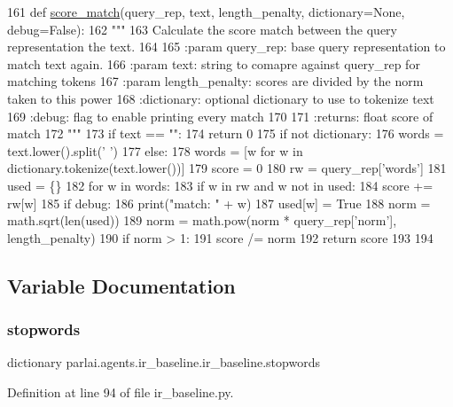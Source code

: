\begin{DoxyCode}
161 \textcolor{keyword}{def }\hyperlink{namespaceparlai_1_1agents_1_1ir__baseline_1_1ir__baseline_a64aaaccb38f5dd5f51c09439456b2f6e}{score\_match}(query\_rep, text, length\_penalty, dictionary=None, debug=False):
162     \textcolor{stringliteral}{"""}
163 \textcolor{stringliteral}{    Calculate the score match between the query representation the text.}
164 \textcolor{stringliteral}{}
165 \textcolor{stringliteral}{    :param query\_rep: base query representation to match text again.}
166 \textcolor{stringliteral}{    :param text: string to comapre against query\_rep for matching tokens}
167 \textcolor{stringliteral}{    :param length\_penalty: scores are divided by the norm taken to this power}
168 \textcolor{stringliteral}{    :dictionary: optional dictionary to use to tokenize text}
169 \textcolor{stringliteral}{    :debug: flag to enable printing every match}
170 \textcolor{stringliteral}{}
171 \textcolor{stringliteral}{    :returns: float score of match}
172 \textcolor{stringliteral}{    """}
173     \textcolor{keywordflow}{if} text == \textcolor{stringliteral}{""}:
174         \textcolor{keywordflow}{return} 0
175     \textcolor{keywordflow}{if} \textcolor{keywordflow}{not} dictionary:
176         words = text.lower().split(\textcolor{stringliteral}{' '})
177     \textcolor{keywordflow}{else}:
178         words = [w \textcolor{keywordflow}{for} w \textcolor{keywordflow}{in} dictionary.tokenize(text.lower())]
179     score = 0
180     rw = query\_rep[\textcolor{stringliteral}{'words'}]
181     used = \{\}
182     \textcolor{keywordflow}{for} w \textcolor{keywordflow}{in} words:
183         \textcolor{keywordflow}{if} w \textcolor{keywordflow}{in} rw \textcolor{keywordflow}{and} w \textcolor{keywordflow}{not} \textcolor{keywordflow}{in} used:
184             score += rw[w]
185             \textcolor{keywordflow}{if} debug:
186                 print(\textcolor{stringliteral}{"match: "} + w)
187         used[w] = \textcolor{keyword}{True}
188     norm = math.sqrt(len(used))
189     norm = math.pow(norm * query\_rep[\textcolor{stringliteral}{'norm'}], length\_penalty)
190     \textcolor{keywordflow}{if} norm > 1:
191         score /= norm
192     \textcolor{keywordflow}{return} score
193 
194 
\end{DoxyCode}


\subsection{Variable Documentation}
\mbox{\label{namespaceparlai_1_1agents_1_1ir__baseline_1_1ir__baseline_ad39f034177c71e873eeedb1cc2d24e52}} 
\subsubsection{\texorpdfstring{stopwords}{stopwords}}
{\footnotesize\ttfamily dictionary parlai.\+agents.\+ir\+\_\+baseline.\+ir\+\_\+baseline.\+stopwords}



Definition at line 94 of file ir\+\_\+baseline.\+py.


